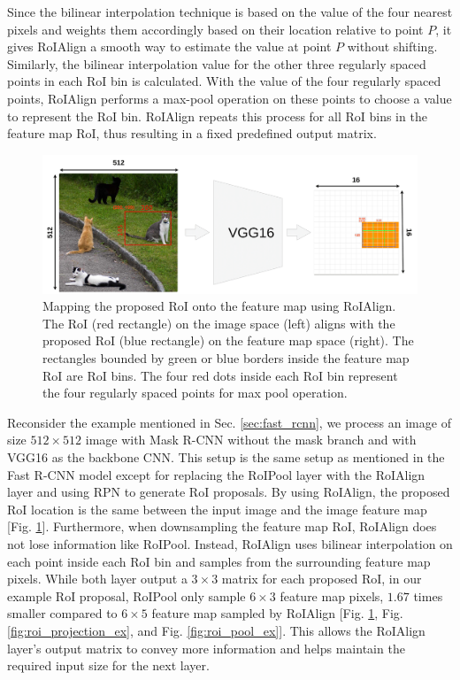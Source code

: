 \noindent Since the bilinear interpolation technique is based on the value of the four nearest pixels and weights them accordingly based on their location relative to point $P$, it gives RoIAlign a smooth way to estimate the value at point $P$ without shifting. Similarly, the bilinear interpolation value for the other three regularly spaced points in each RoI bin is calculated. With the value of the four regularly spaced points, RoIAlign performs a max-pool operation on these points to choose a value to represent the RoI bin. RoIAlign repeats this process for all RoI bins in the feature map RoI, thus resulting in a fixed predefined output matrix.

\begin{figure}[!ht]
    \centering
    \includegraphics[width=6in]{figures/roi_align_ex.png}
    \caption{Mapping the proposed RoI onto the feature map using RoIAlign. The RoI (red rectangle) on the image space (left) aligns with the proposed RoI (blue rectangle) on the feature map space (right). The rectangles bounded by green or blue borders inside the feature map RoI are RoI bins. The four red dots inside each RoI bin represent the four regularly spaced points for max pool operation. \cite{roi_pooling_problem}}
    \label{fig:roi_align_ex}
\end{figure}

Reconsider the example mentioned in Sec. \ref{sec:fast_rcnn}, we process an image of size $512 \times 512$ image with Mask R-CNN without the mask branch and with VGG16 as the backbone CNN. This setup is the same setup as mentioned in the Fast R-CNN model except for replacing the RoIPool layer with the RoIAlign layer and using RPN to generate RoI proposals. By using RoIAlign, the proposed RoI location is the same between the input image and the image feature map [Fig. \ref{fig:roi_align_ex}]. Furthermore, when downsampling the feature map RoI, RoIAlign does not lose information like RoIPool. Instead, RoIAlign uses bilinear interpolation on each point inside each RoI bin and samples from the surrounding feature map pixels. While both layer output a $3 \times 3$ matrix for each proposed RoI, in our example RoI proposal, RoIPool only sample $6 \times 3$ feature map pixels, $1.67$ times smaller compared to $6 \times 5$ feature map sampled by RoIAlign [Fig. \ref{fig:roi_align_ex}, Fig. \ref{fig:roi_projection_ex}, and Fig. \ref{fig:roi_pool_ex}]. This allows the RoIAlign layer's output matrix to convey more information and helps maintain the required input size for the next layer.

